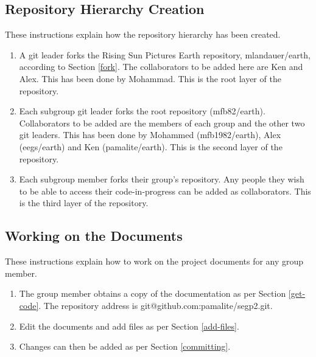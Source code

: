 \documentclass{article}
\begin{document}
\subsection{Repository Hierarchy Creation}
These instructions explain how the repository hierarchy has been created.
\begin{enumerate}
	\item A git leader forks the Rising Sun Pictures Earth repository, mlandauer/earth, according to Section \ref{fork}. The collaborators to be added here are Ken and Alex. This has been done by Mohammad. This is the root layer of the repository.
	\item Each subgroup git leader forks the root repository (mfb82/earth). Collaborators to be added are the members of each group and the other two git leaders. This has been done by Mohammed (mfb1982/earth), Alex (eegs/earth) and Ken (pamalite/earth). This is the second layer of the repository.
	\item Each subgroup member forks their group's repository. Any people they wish to be able to access their code-in-progress can be added as collaborators. This is the third layer of the repository.
\end{enumerate}

\subsection{Working on the Documents}
\label{working}
These instructions explain how to work on the project documents for any group member.
\begin{enumerate}
	\item The group member obtains a copy of the documentation as per Section \ref{get-code}. The repository address is git@github.com:pamalite/segp2.git.\\
	\item Edit the documents and add files as per Section \ref{add-files}.
	\item Changes can then be added as per Section \ref{committing}.
\end{enumerate}
\end{document}
